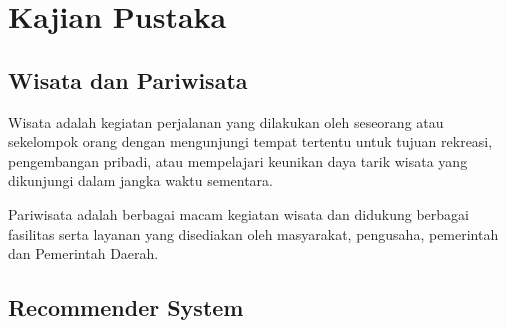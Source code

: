 \chapter{Kajian Pustaka}

\section{Wisata dan Pariwisata}
Wisata adalah kegiatan perjalanan yang dilakukan oleh seseorang atau sekelompok orang dengan mengunjungi tempat tertentu untuk tujuan rekreasi, pengembangan pribadi, atau mempelajari
keunikan daya tarik wisata yang dikunjungi dalam jangka waktu sementara.

Pariwisata adalah berbagai macam kegiatan wisata dan didukung berbagai fasilitas serta layanan yang disediakan oleh masyarakat, pengusaha, pemerintah dan Pemerintah Daerah\cite{uupariwisata}.

\section{Recommender System}


